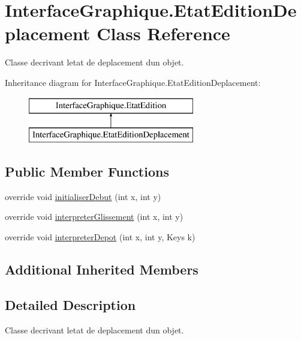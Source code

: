 \hypertarget{class_interface_graphique_1_1_etat_edition_deplacement}{}\section{Interface\+Graphique.\+Etat\+Edition\+Deplacement Class Reference}
\label{class_interface_graphique_1_1_etat_edition_deplacement}


Classe decrivant l\textquotesingle{}etat de deplacement d\textquotesingle{}un objet.  


Inheritance diagram for Interface\+Graphique.\+Etat\+Edition\+Deplacement\+:\begin{figure}[H]
\begin{center}
\leavevmode
\includegraphics[height=2.000000cm]{class_interface_graphique_1_1_etat_edition_deplacement}
\end{center}
\end{figure}
\subsection*{Public Member Functions}
\begin{DoxyCompactItemize}
\item 
override void \hyperlink{group__inf2990_gabc8016b3e2aa3cb05ab7ed46e09f9756}{initialiser\+Debut} (int x, int y)
\item 
override void \hyperlink{group__inf2990_ga7a539c405dacfc8c4db9236c3339ac78}{interpreter\+Glissement} (int x, int y)
\item 
override void \hyperlink{group__inf2990_gad7f3950cc5a7424a4202b13e2887ba98}{interpreter\+Depot} (int x, int y, Keys k)
\end{DoxyCompactItemize}
\subsection*{Additional Inherited Members}


\subsection{Detailed Description}
Classe decrivant l\textquotesingle{}etat de deplacement d\textquotesingle{}un objet. 

